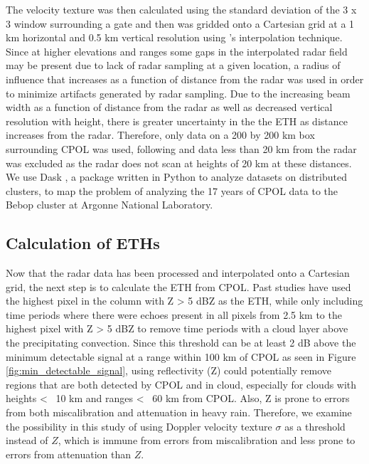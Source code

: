 \documentclass[journal abbreviation, manuscript]{copernicus}
\begin{document}
The velocity texture was then calculated using the standard deviation of the 3 x 3 window surrounding a gate and then was gridded onto a Cartesian grid at a 1 km horizontal and 0.5 km vertical resolution using \cite{Barnes1964}'s interpolation technique. Since at higher elevations and ranges some gaps in the interpolated radar field may be present due to lack of radar sampling at a given location, a radius of influence that increases as a function of distance from the radar was used in order to minimize artifacts generated by radar sampling. Due to the increasing beam width as a function of distance from the radar as well as decreased vertical resolution with height, there is greater uncertainty in the the ETH as distance increases from the radar. Therefore, only data on a 200 by 200 km box surrounding CPOL was used, following \citep{Kumaretal2013b} and data less than 20 km from the radar was excluded as the radar does not scan at heights of 20 km at these distances. We use Dask \citep{Dask2016}, a package written in Python to analyze datasets on distributed clusters, to map the problem of analyzing the 17 years of CPOL data to the Bebop cluster at Argonne National Laboratory. 

\subsection{Calculation of ETHs}

	Now that the radar data has been processed and interpolated onto a Cartesian grid, the next step is to calculate the ETH from CPOL. Past studies \citep{MayandBallinger2006, Kumaretal2013, Kumaretal2013b} have used the highest pixel in the column with Z > 5 dBZ as the ETH, while only including time periods where there were echoes present in all pixels from 2.5 km to the highest pixel with Z > 5 dBZ to remove time periods with a cloud layer above the precipitating convection. Since this threshold can be at least 2 dB above the minimum detectable signal at a range within 100 km of CPOL as seen in Figure \ref{fig:min_detectable_signal}, using reflectivity (Z) could potentially remove regions that are both detected by CPOL and in cloud, especially for clouds with heights < ~10 km and ranges < ~60 km from CPOL. Also, Z is prone to errors from both miscalibration and attenuation in heavy rain. Therefore, we examine the possibility in this study of using Doppler velocity texture $\sigma$ as a threshold instead of $Z$, which is immune from errors from miscalibration and less prone to errors from attenuation than $Z$. 
    
\end{document}
